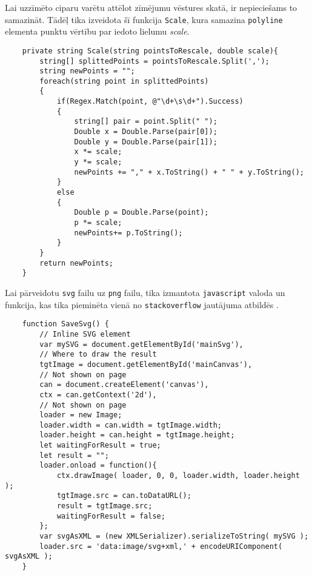 \par Lai uzzīmēto ciparu varētu attēlot zīmējumu vēstures skatā, ir nepieciešams to samazināt. Tādēļ tika izveidota šī funkcija \texttt{Scale}, kura samazina \texttt{polyline} elementa punktu vērtību par iedoto lielumu \textit{scale}.
{
\begin{verbatim}
    private string Scale(string pointsToRescale, double scale){
        string[] splittedPoints = pointsToRescale.Split(',');
        string newPoints = "";
        foreach(string point in splittedPoints)
        {
            if(Regex.Match(point, @"\d+\s\d+").Success)
            {
                string[] pair = point.Split(" ");
                Double x = Double.Parse(pair[0]);
                Double y = Double.Parse(pair[1]);
                x *= scale;
                y *= scale;
                newPoints += "," + x.ToString() + " " + y.ToString();
            }
            else
            {
                Double p = Double.Parse(point);
                p *= scale;
                newPoints+= p.ToString();
            }
        }
        return newPoints;
    }
\end{verbatim}
}

\par Lai pārveidotu \texttt{svg} failu uz \texttt{png} failu, tika izmantota \texttt{javascript} valoda un funkcija, kas tika pieminēta vienā no \texttt{stackoverflow} jautājuma atbildēs \cite{stackoverflow_answer}.

{
\begin{verbatim}
    function SaveSvg() {
        // Inline SVG element
        var mySVG = document.getElementById('mainSvg'),
        // Where to draw the result
        tgtImage = document.getElementById('mainCanvas'),
        // Not shown on page
        can = document.createElement('canvas'),
        ctx = can.getContext('2d'),
        // Not shown on page
        loader = new Image;
        loader.width = can.width = tgtImage.width;
        loader.height = can.height = tgtImage.height;
        let waitingForResult = true;
        let result = "";
        loader.onload = function(){
            ctx.drawImage( loader, 0, 0, loader.width, loader.height );
            tgtImage.src = can.toDataURL();
            result = tgtImage.src;
            waitingForResult = false;
        };
        var svgAsXML = (new XMLSerializer).serializeToString( mySVG );
        loader.src = 'data:image/svg+xml,' + encodeURIComponent( svgAsXML );
    }
\end{verbatim}
}

